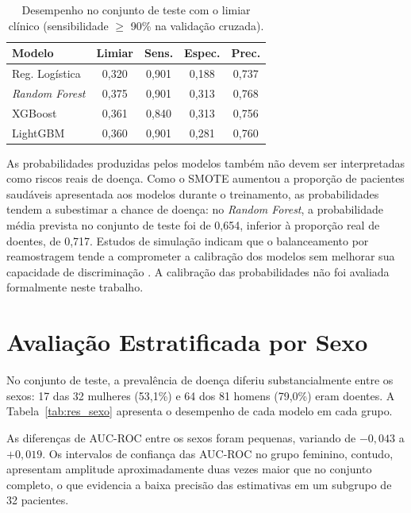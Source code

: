 \begin{table}[htbp]
\centering
\begin{tabular}{lcccc}
\hline
\textbf{Modelo} & \textbf{Limiar} & \textbf{Sens.} & \textbf{Espec.} & \textbf{Prec.} \\
\hline
Reg. Logística         & 0,320 & 0,901 & 0,188 & 0,737 \\
\textit{Random Forest} & 0,375 & 0,901 & 0,313 & 0,768 \\
XGBoost                & 0,361 & 0,840 & 0,313 & 0,756 \\
LightGBM               & 0,360 & 0,901 & 0,281 & 0,760 \\
\hline
\end{tabular}
\caption{Desempenho no conjunto de teste com o limiar clínico (sensibilidade $\geq$ 90\% na validação cruzada).}
\label{tab:res_limiares}
\end{table}

As probabilidades produzidas pelos modelos também não devem ser interpretadas como riscos reais de doença. Como o SMOTE aumentou a proporção de pacientes saudáveis apresentada aos modelos durante o treinamento, as probabilidades tendem a subestimar a chance de doença: no \textit{Random Forest}, a probabilidade média prevista no conjunto de teste foi de 0,654, inferior à proporção real de doentes, de 0,717. Estudos de simulação indicam que o balanceamento por reamostragem tende a comprometer a calibração dos modelos sem melhorar sua capacidade de discriminação \cite{vandenGoorbergh2022Harm, Carriero2025Harms}. A calibração das probabilidades não foi avaliada formalmente neste trabalho.

\section{Avaliação Estratificada por Sexo}
\label{sec:res_sexo}

No conjunto de teste, a prevalência de doença diferiu substancialmente entre os sexos: 17 das 32 mulheres (53,1\%) e 64 dos 81 homens (79,0\%) eram doentes. A Tabela~\ref{tab:res_sexo} apresenta o desempenho de cada modelo em cada grupo.

As diferenças de AUC-ROC entre os sexos foram pequenas, variando de $-0{,}043$ a $+0{,}019$. Os intervalos de confiança das AUC-ROC no grupo feminino, contudo, apresentam amplitude aproximadamente duas vezes maior que no conjunto completo, o que evidencia a baixa precisão das estimativas em um subgrupo de 32 pacientes.

